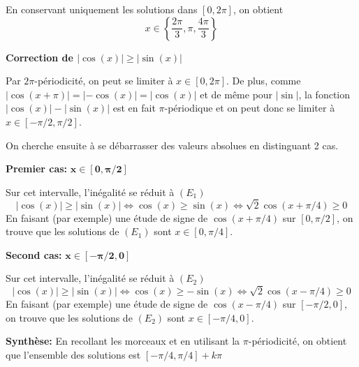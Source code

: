 \documentclass[a4paper,12pt]{article}
\begin{document}
En conservant uniquement les solutions dans $[0, 2\pi]$, on obtient
\[
x \in \left\{ \frac{2\pi}{3}, \pi, \frac{4\pi}{3} \right\}
\]

\textbf{Correction de $|\cos(x)| \geq |\sin(x)|$}

Par $2\pi$-périodicité, on peut se limiter à $x \in [0,2\pi]$. De plus, comme $|\cos(x + \pi)| = |-\cos(x)| = |\cos(x)|$ et de même pour $|\sin|$, la fonction $|\cos(x)| - |\sin(x)|$ est en fait $\pi$-périodique et on peut donc se limiter à $x \in [-\pi/2, \pi/2]$.

On cherche ensuite à se débarrasser des valeurs absolues en distinguant 2 cas.

\textbf{Premier cas:} $\mathbf{x \in [0, \pi/2]}$

Sur cet intervalle, l'inégalité se réduit à $(E_1)$
\[
|\cos(x)| \geq |\sin(x)| \Leftrightarrow \cos(x) \geq \sin(x) \Leftrightarrow \sqrt{2}\cos(x + \pi/4) \geq 0
\]
En faisant (par exemple) une étude de signe de $\cos(x + \pi/4)$ sur $[0, \pi/2]$, on trouve que les solutions de $(E_1)$ sont $x \in [0, \pi/4]$.

\textbf{Second cas:} $\mathbf{x \in [-\pi/2, 0]}$

Sur cet intervalle, l'inégalité se réduit à $(E_2)$
\[
|\cos(x)| \geq |\sin(x)| \Leftrightarrow \cos(x) \geq -\sin(x) \Leftrightarrow \sqrt{2}\cos(x - \pi/4) \geq 0
\]
En faisant (par exemple) une étude de signe de $\cos(x - \pi/4)$ sur $[-\pi/2, 0]$, on trouve que les solutions de $(E_2)$ sont $x \in [-\pi/4, 0]$.

\textbf{Synthèse:}
En recollant les morceaux et en utilisant la $\pi$-périodicité, on obtient que l'ensemble des solutions est $[-\pi/4, \pi/4] + k\pi$
\end{document}
